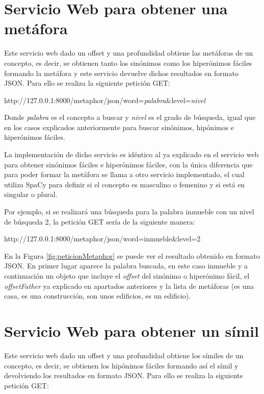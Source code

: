 \section{Servicio Web  para obtener una metáfora}
Este servicio web dado un offset y una profundidad obtiene las metáforas de un concepto, es decir, se obtienen tanto los sinónimos como los hiperónimos fáciles formando la metáfora y este servicio devuelve dichos resultados en formato JSON.
Para ello se realiza la siguiente petición GET:

http://127.0.0.1:8000/metaphor/json/word=\textit{palabra}\&level=\textit{nivel}

Donde \textit{palabra} es el concepto a buscar y \textit{nivel} es el grado de búsqueda, igual que en los casos explicados anteriormente para buscar sinónimos, hipónimos e hiperónimos fáciles.

La implementación de dicho servicio es idéntico al ya explicado en el servicio web para obtener sinónimos fáciles e hiperónimos fáciles, con la única diferencia que para poder formar la metáfora se llama a otro servicio implementado, el cual utiliza SpaCy para definir si el concepto es masculino o femenino y si está en singular o plural.

Por ejemplo, si se realizará una búsqueda para la palabra inmueble con un nivel de búsqueda 2, la petición GET sería de la siguiente manera:

http://127.0.0.1:8000/metaphor/json/word=inmueble\&level=2

En la Figura \ref{fig:peticionMetaphor} se puede ver el resultado obtenido en formato JSON. En primer lugar aparece la palabra buscada, en este caso inmueble y a continuación un objeto que incluye el \textit{offset} del sinónimo o hiperónimo fácil, el \textit{offsetFather}  ya explicado en apartados anteriores y la lista de metáforas (es una casa, es una construcción, son unos edificios, es un edificio). 


\section{Servicio Web  para obtener un símil}
Este servicio web dado un offset y una profundidad obtiene los símiles de un concepto, es decir, se obtienen los hipónimos fáciles formando así el símil y devolviendo los resultados en formato JSON.
Para ello se realiza la siguiente petición GET:

